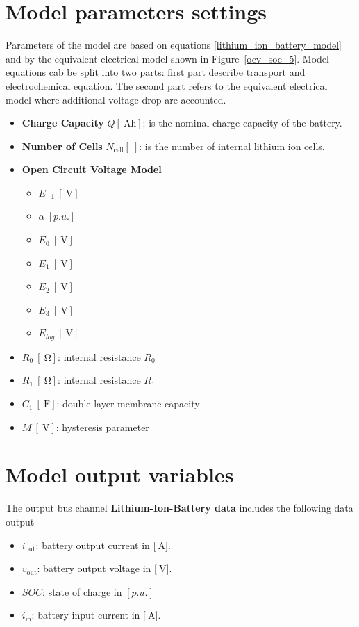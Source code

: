 \documentclass[12pt,a4paper]{scrartcl}
\begin{document}
\begin{onehalfspace}
\section{Model parameters settings}
Parameters of the model are based on equations \eqref{lithium_ion_battery_model} and by the equivalent electrical model shown in Figure~\ref{ocv_soc_5}. Model equations cab be split into two parts: first part describe transport and electrochemical equation. The second part refers to the equivalent electrical model where additional voltage drop are accounted. 
\begin{itemize}
	\item[$-$] \textbf{Charge Capacity} $Q[\SI{}{\ampere\hour}]$: is the nominal charge capacity of the battery.
	\item[$-$] \textbf{Number of Cells} $N_\text{cell}[\SI{}{}]$: is the number of internal lithium ion cells.
	\item[$-$] \textbf{Open Circuit Voltage Model} 
	\begin{itemize}
		\item[$-$] $E_{-1}\ [\SI{}{\volt}]$
		\item[$-$] $\alpha\ [p.u.]$
		\item[$-$] $E_{0}\ [\SI{}{\volt}]$
		\item[$-$] $E_{1}\ [\SI{}{\volt}]$
		\item[$-$] $E_{2}\ [\SI{}{\volt}]$
		\item[$-$] $E_{3}\ [\SI{}{\volt}]$
		\item[$-$] $E_{log}\ [\SI{}{\volt}]$
	\end{itemize}
	\item[$-$] $R_{0}\ [\SI{}{\ohm}]$: internal resistance $R_0$
	\item[$-$] $R_{1}\ [\SI{}{\ohm}]$: internal resistance $R_1$
	\item[$-$] $C_{1}\ [\SI{}{\farad}]$: double layer membrane capacity
	\item[$-$] $M\ [\SI{}{\volt}]$: hysteresis parameter
\end{itemize}

\section{Model output variables}
The output bus channel \textbf{Lithium-Ion-Battery data} includes the following data output
\begin{itemize}
	\item[$-$] $i_\text{out}$: battery output current in $\Big[\SI{}{\ampere}\Big]$.
	\item[$-$] $v_\text{out}$: battery output voltage in $\Big[\SI{}{\volt}\Big]$.  
	\item[$-$] $SOC$: state of charge in $[p.u.]$
	\item[$-$] $i_\text{in}$: battery input current in $\Big[\SI{}{\ampere}\Big]$.
\end{itemize}
\end{onehalfspace}
	
\end{document}
